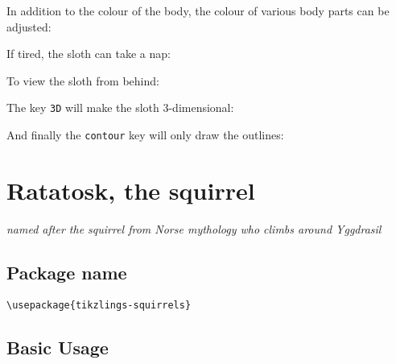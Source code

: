 \documentclass[parskip=half]{scrartcl}
\begin{document}
In addition to the colour of the body, the colour of various body parts can be adjusted:
\begin{tcblisting}{}
\sloth[eye=red]
\end{tcblisting}
\begin{tcblisting}{}
\sloth[mouth=red]
\end{tcblisting}

If tired, the sloth can take a nap:
\begin{tcblisting}{}
\sloth[sleeping]
\end{tcblisting}
\begin{tcblisting}{}
\sloth[sleeping,eyelid=red]
\end{tcblisting}

To view the sloth from behind:
\begin{tcblisting}{}
\sloth[back]
\end{tcblisting}

The key \lstinline|3D| will make the sloth 3-dimensional:
\begin{tcblisting}{}
\sloth[3D]
\end{tcblisting}

And finally the \lstinline|contour| key will only draw the outlines:
\begin{tcblisting}{}
\sloth[contour=black]
\end{tcblisting}

%
%
\clearpage
\section[Squirrel]{Ratatosk, the squirrel}

\emph{named after the squirrel from Norse mythology who climbs around Yggdrasil}

\subsection{Package name}

\begin{tcolorbox}[lower separated=false, lefthand width=.8\linewidth]
\vspace*{0.5cm}
\lstinline|\usepackage{tikzlings-squirrels}| 
\vspace*{0.5cm}
\end{tcolorbox}

\subsection{Basic Usage}
\end{document}
